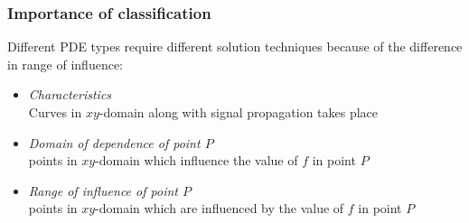 \documentclass[11pt,table,final,fleqn,xcolor={usenames,dvipsnames,table}]{beamer}
\begin{document}
\begin{frame}
\begin{columns}
{\begin{center}
      \end{center}
    }
  \end{columns}
  \vfill
\end{frame}

\begin{frame}
  \frametitle{Importance of classification}
  Different PDE types require different solution techniques because of the difference in range of influence:
  \begin{itemize}
     \item \emph{Characteristics} \\
    Curves in $xy$-domain along with signal propagation takes place
     \item \emph{Domain of dependence of point $P$} \\
    points in $xy$-domain which influence the value of $f$ in point $P$
     \item \emph{Range of influence of point $P$}\\
    points in $xy$-domain which are influenced by the value of $f$ in point $P$
  \end{itemize}
\end{frame}
\end{document}
